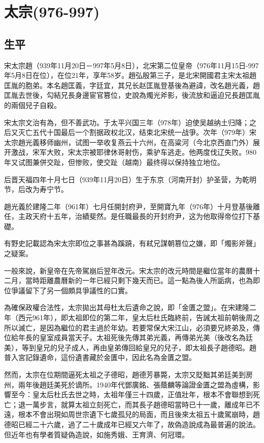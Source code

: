
\section{太宗\tiny(976-997)}

\subsection{生平}

宋太宗趙（939年11月20日－997年5月8日），北宋第二位皇帝（976年11月15日-997年5月8日在位），在位21年，享年58岁。趙弘殷第三子，是北宋開國君主宋太祖趙匡胤的胞弟。本名趙匡義，字廷宜，其兄长赵匡胤登基後為避諱，改名趙光義，趙匡胤去世後，勾結兄長身邊宦官篡位，史說為燭光斧影，後流放和逼迫兄長趙匡胤的兩個兒子自殺。

宋太宗文治有為，但不善武功。于太平兴国三年（978年）迫使吴越纳土归降；之后又灭亡五代十国最后一个割据政权北汉，结束北宋统一战爭。次年（979年）宋太宗趙光義移师幽州，试图一举收复燕云十六州，在高粱河（今北京西直门外）展开激战，宋军大败，宋太宗被耶律休哥射伤，乘驴车逃走。他两度伐辽失败。980年又试图兼併交趾，但惨败，使交趾（越南）最终得以保持独立地位。

后晋天福四年十月七日（939年11月20日）生于东京（河南开封）护圣营，为乾明节，后改为寿宁节。

趙光義於建隆二年（961年）七月任開封府尹，至開寶九年（976年）十月登基後離任，主政天府十五年，治績斐然。是任職最長的开封府尹，这为他取得帝位打下基礎。

有野史記載認為宋太宗即位之事甚為蹊蹺，有弒兄謀朝篡位之嫌，即「燭影斧聲」之疑案。

一般來說，新皇帝在先帝駕崩后翌年改元。宋太宗的改元時間是繼位當年的農曆十二月，當時距離農曆新的一年已經只剩下幾天而已。這一點為後人所詬病，也為即位爭議留下了另一個頗具爭議性的口實。

為確保政權合法性，太宗拋出其母杜太后遺命之說，即「金匱之盟」。在宋建隆二年（西元961年），即太祖即位的第二年，皇太后杜氏臨終前，告誡太祖前朝後周之所以滅亡，是因為繼位的君主過於年幼。若要常保大宋江山，必須要兄終弟及，傳位給年長的皇室成員當天子。太祖死後先傳其弟光義，再傳弟光美（後改名為廷美），等到皇兄的兒子成人，再由皇弟傳回給皇兄的兒子，即太祖長子趙德昭。趙普入宮記錄遺命，這份遺書藏於金匱中，因此名為金匱之盟。

然而，太宗在位期間逼死太祖之子德昭，趙德芳暴斃，太宗又貶黜其弟廷美到房州，兩年後趙廷美死於谪所。1940年代鄧廣銘、張蔭麟等論證金匱之盟為虛構，影響至今：皇太后杜氏去世之時，太祖年僅三十四歲，正值壯年，根本不會聯想到死亡；退一萬步言，就算太祖立刻死亡，而其長子趙德昭當時已十一歲，離成年已不遠，根本不會出現如周世宗遺下七歲孤兒的局面，而且後來太祖五十歲駕崩時，趙德昭已經二十六歲，過了二十歲成年已經又六年了，故偽造說成為最普遍的說法。但近年也有學者質疑偽造說，如施秀娥、王育濟、何冠環。

